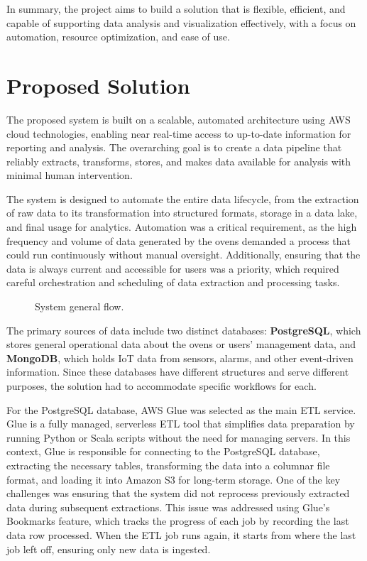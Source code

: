 In summary, the project aims to build a solution that is flexible, efficient, and capable of supporting data analysis and visualization effectively, with a focus on automation, resource optimization, and ease of use.
\section{Proposed Solution}
The proposed system is built on a scalable, automated architecture using \ac{AWS} cloud technologies, enabling near real-time access to up-to-date information for reporting and analysis. The overarching goal is to create a data pipeline that reliably extracts, transforms, stores, and makes data available for analysis with minimal human intervention.

The system is designed to automate the entire data lifecycle, from the extraction of raw data to its transformation into structured formats, storage in a data lake, and final usage for analytics. Automation was a critical requirement, as the high frequency and volume of data generated by the ovens demanded a process that could run continuously without manual oversight. Additionally, ensuring that the data is always current and accessible for users was a priority, which required careful orchestration and scheduling of data extraction and processing tasks.

\begin{figure}[H]
    \centering
    
    \caption{System general flow.}
\end{figure}

The primary sources of data include two distinct databases: \textbf{PostgreSQL}, which stores general operational data about the ovens or users' management data, and \textbf{MongoDB}, which holds IoT data from sensors, alarms, and other event-driven information. Since these databases have different structures and serve different purposes, the solution had to accommodate specific workflows for each.

For the PostgreSQL database, \ac{AWS} Glue was selected as the main \ac{ETL} service. Glue is a fully managed, serverless \ac{ETL} tool that simplifies data preparation by running Python or Scala scripts without the need for managing servers. In this context, Glue is responsible for connecting to the PostgreSQL database, extracting the necessary tables, transforming the data into a columnar file format, and loading it into Amazon S3 for long-term storage. One of the key challenges was ensuring that the system did not reprocess previously extracted data during subsequent extractions. This issue was addressed using Glue's Bookmarks feature, which tracks the progress of each job by recording the last data row processed. When the \ac{ETL} job runs again, it starts from where the last job left off, ensuring only new data is ingested.

